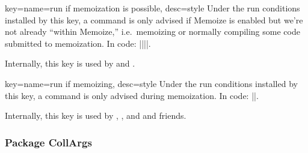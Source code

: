 \documentclass[a4paper,11pt]{article}
\begin{document}
\begin{doc}{key={name=run if memoization is possible, desc=style}}
  Under the run conditions installed by this key, a command is only advised if
  Memoize is enabled but we're not already ``within Memoize,'' i.e.\ memoizing
  or normally compiling some code submitted to memoization.  In code:
  |\else||\fi\fi|.

  Internally, this key is used by  and .
\end{doc}

\begin{doc}{key={name=run if memoizing, desc=style}}
  Under the run conditions installed by this key, a command is only advised
  during memoization.  In code:
  |\fi\fi|.
  
  Internally, this key is used by , ,
  and  and friends.
\end{doc}

\endgroup %
\endgroup



\subsubsection{Package CollArgs}
\label{sec:ref:collargs}

\begingroup
{}
\end{document}

